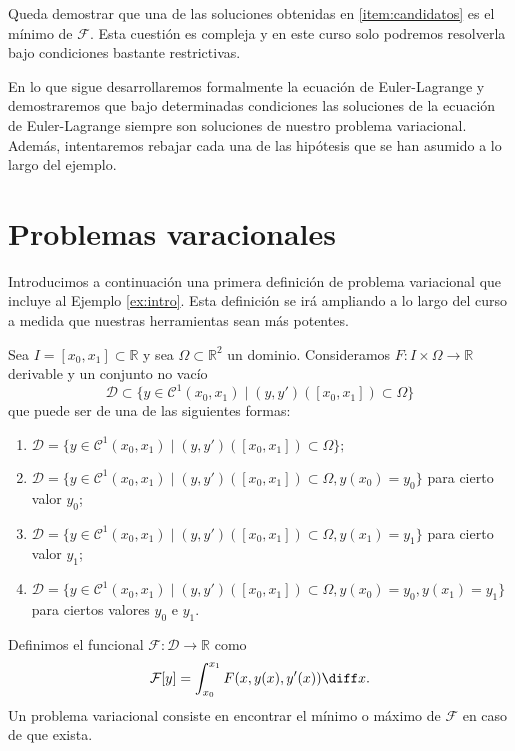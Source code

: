 \documentclass{article}
\begin{document}
Queda demostrar que una de las soluciones obtenidas en \ref{item:candidatos} es el mínimo de
$\mathcal{F}$. Esta cuestión es compleja y en este curso solo podremos resolverla bajo condiciones
bastante restrictivas.

En lo que sigue desarrollaremos formalmente la ecuación de Euler-Lagrange y
demostraremos que bajo determinadas condiciones las soluciones de la ecuación de Euler-Lagrange
siempre son soluciones de nuestro problema variacional. Además, intentaremos rebajar cada una de las
hipótesis que se han asumido a lo largo del ejemplo.
  
\section{Problemas varacionales} \label{sec:pv}

Introducimos a continuación una primera definición de problema variacional que incluye al Ejemplo
\ref{ex:intro}. Esta definición se irá ampliando a lo largo del curso a medida que nuestras
herramientas sean más potentes.

\begin{definition} \label{def:pv} Sea $I = [x_0, x_1] \subset \mathbb{R}$ y sea
  $\Omega \subset \mathbb{R}^2$ un dominio. Consideramos $F\colon I \times \Omega \to \mathbb{R}$
  derivable y un conjunto no vacío
  \[\mathcal{D} \subset \{y \in \mathcal{C}^1(x_0, x_1)\mid (y, y')([x_0, x_1]) \subset \Omega\}\]
  que puede ser de una de las siguientes formas:
  \begin{enumerate}
  \item $\mathcal{D} = \{y \in \mathcal{C}^1(x_0, x_1)\mid (y, y')([x_0, x_1]) \subset \Omega\};$
  \item
    $\mathcal{D} = \{y \in \mathcal{C}^1(x_0, x_1)\mid (y, y')([x_0, x_1]) \subset \Omega, y(x_0) =
    y_0\}$ para cierto valor $y_0$;
  \item
    $\mathcal{D} = \{y \in \mathcal{C}^1(x_0, x_1)\mid (y, y')([x_0, x_1]) \subset \Omega, y(x_1) =
    y_1\}$ para cierto valor $y_1$;
  \item
    $\mathcal{D} = \{y \in \mathcal{C}^1(x_0, x_1)\mid (y, y')([x_0, x_1]) \subset \Omega, y(x_0) =
    y_0, y(x_1) = y_1\}$ para ciertos valores $y_0$ e $y_1$.
  \end{enumerate}

  Definimos el funcional $\mathcal{F}\colon \mathcal{D} \to \mathbb{R}$ como
  \[\mathcal{F}[y] = \int_{x_0}^{x_1} F(x, y(x), y'(x)) \diff x.\]
  Un problema variacional consiste en encontrar el mínimo o máximo de $\mathcal{F}$ en caso de que
  exista.
\end{definition}
\end{document}
